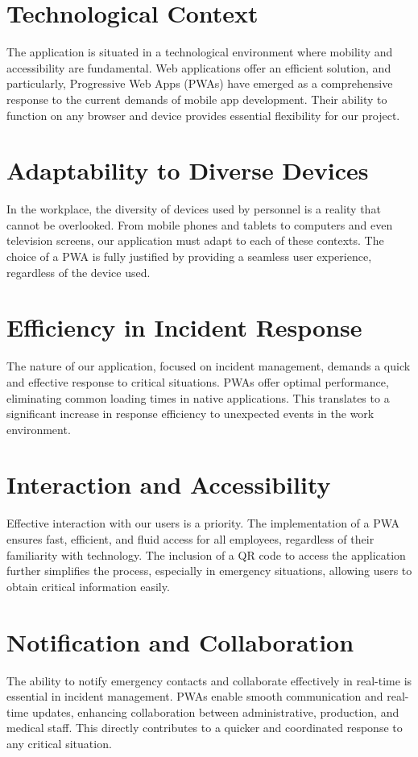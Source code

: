 \documentclass{report}
\begin{document}
\section{Technological Context}\label{Technological Context}

The application is situated in a technological environment where mobility and accessibility are fundamental. Web applications offer an efficient solution, and particularly, Progressive Web Apps (PWAs) have emerged as a comprehensive response to the current demands of mobile app development. Their ability to function on any browser and device provides essential flexibility for our project.

\section{Adaptability to Diverse Devices}\label{Adaptability to Diverse Devices}
In the workplace, the diversity of devices used by personnel is a reality that cannot be overlooked. From mobile phones and tablets to computers and even television screens, our application must adapt to each of these contexts. The choice of a PWA is fully justified by providing a seamless user experience, regardless of the device used.


\section{Efficiency in Incident Response}\label{Efficiency in Incident Response}
The nature of our application, focused on incident management, demands a quick and effective response to critical situations. PWAs offer optimal performance, eliminating common loading times in native applications. This translates to a significant increase in response efficiency to unexpected events in the work environment.

\section{Interaction and Accessibility}\label{Interaction and Accessibility}
Effective interaction with our users is a priority. The implementation of a PWA ensures fast, efficient, and fluid access for all employees, regardless of their familiarity with technology. The inclusion of a QR code to access the application further simplifies the process, especially in emergency situations, allowing users to obtain critical information easily.

\section{Notification and Collaboration}\label{Notification and Collaboration}
The ability to notify emergency contacts and collaborate effectively in real-time is essential in incident management. PWAs enable smooth communication and real-time updates, enhancing collaboration between administrative, production, and medical staff. This directly contributes to a quicker and coordinated response to any critical situation.
\end{document}
